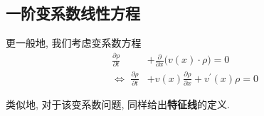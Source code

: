 \vspace*{5em}
	
\subsection{一阶变系数线性方程}
	更一般地, 我们考虑变系数方程
	\begin{align}
		\frac{\partial \rho}{\partial t} &+ \frac{\partial}{\partial x} \Big( v(x) \cdot \rho \Big) = 0 \\
		\Leftrightarrow \,\, \frac{\partial \rho}{\partial t} &+ v(x) \frac{\partial \rho}{\partial x} + v^{'}(x) \rho = 0 \label{1.3}
	\end{align}
	
	\vspace*{1em}
	
	类似地, 对于该变系数问题, 同样给出\textbf{特征线}的定义. 
	
